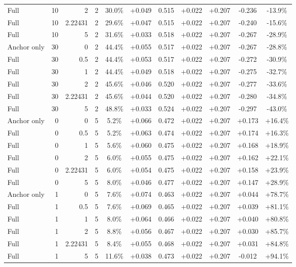 \begin{table}[htbp]
\begin{tabular}{lrrrccccccc}
Full & 10 & 2 & 2 & 30.0\% & +0.049 & 0.515 & +0.022 & +0.207 & -0.236 & -13.9\% \\
Full & 10 & 2.22431 & 2 & 29.6\% & +0.047 & 0.515 & +0.022 & +0.207 & -0.240 & -15.6\% \\
Full & 10 & 5 & 2 & 31.6\% & +0.033 & 0.518 & +0.022 & +0.207 & -0.267 & -28.9\% \\
Anchor only & 30 & 0 & 2 & 44.4\% & +0.055 & 0.517 & +0.022 & +0.207 & -0.267 & -28.8\% \\
Full & 30 & 0.5 & 2 & 44.4\% & +0.053 & 0.517 & +0.022 & +0.207 & -0.272 & -30.9\% \\
Full & 30 & 1 & 2 & 44.4\% & +0.049 & 0.518 & +0.022 & +0.207 & -0.275 & -32.7\% \\
Full & 30 & 2 & 2 & 45.6\% & +0.046 & 0.520 & +0.022 & +0.207 & -0.277 & -33.6\% \\
Full & 30 & 2.22431 & 2 & 45.6\% & +0.044 & 0.520 & +0.022 & +0.207 & -0.280 & -34.8\% \\
Full & 30 & 5 & 2 & 48.8\% & +0.033 & 0.524 & +0.022 & +0.207 & -0.297 & -43.0\% \\
Anchor only & 0 & 0 & 5 & 5.2\% & +0.066 & 0.472 & +0.022 & +0.207 & +0.173 & +16.4\% \\
Full & 0 & 0.5 & 5 & 5.2\% & +0.063 & 0.474 & +0.022 & +0.207 & +0.174 & +16.3\% \\
Full & 0 & 1 & 5 & 5.6\% & +0.060 & 0.475 & +0.022 & +0.207 & +0.168 & +18.9\% \\
Full & 0 & 2 & 5 & 6.0\% & +0.055 & 0.475 & +0.022 & +0.207 & +0.162 & +22.1\% \\
Full & 0 & 2.22431 & 5 & 6.0\% & +0.054 & 0.475 & +0.022 & +0.207 & +0.158 & +23.9\% \\
Full & 0 & 5 & 5 & 8.0\% & +0.046 & 0.477 & +0.022 & +0.207 & +0.147 & +28.9\% \\
Anchor only & 1 & 0 & 5 & 7.6\% & +0.074 & 0.463 & +0.022 & +0.207 & +0.044 & +78.7\% \\
Full & 1 & 0.5 & 5 & 7.6\% & +0.069 & 0.465 & +0.022 & +0.207 & +0.039 & +81.1\% \\
Full & 1 & 1 & 5 & 8.0\% & +0.064 & 0.466 & +0.022 & +0.207 & +0.040 & +80.8\% \\
Full & 1 & 2 & 5 & 8.8\% & +0.056 & 0.467 & +0.022 & +0.207 & +0.030 & +85.7\% \\
Full & 1 & 2.22431 & 5 & 8.4\% & +0.055 & 0.468 & +0.022 & +0.207 & +0.031 & +84.8\% \\
Full & 1 & 5 & 5 & 11.6\% & +0.038 & 0.473 & +0.022 & +0.207 & -0.012 & +94.1\% \\

\end{tabular}
\end{table}
